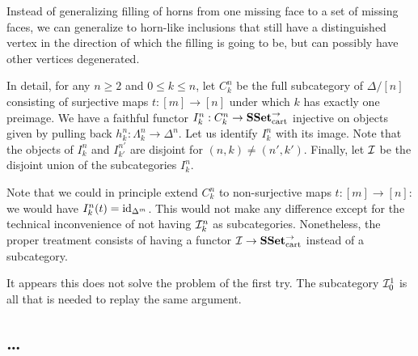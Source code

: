 \documentclass[reqno,10pt,a4paper,oneside]{amsart}
\begin{document}
Instead of generalizing filling of horns from one missing face to a set of missing faces, we can generalize to horn-like inclusions that still have a distinguished vertex in the direction of which the filling is going to be, but can possibly have other vertices degenerated.

In detail, for any $n \geq 2$ and $0 \leq k \leq n$, let $C_k^n$ be the full subcategory of $\Delta/[n]$ consisting of surjective maps $t : [m] \to [n]$ under which $k$ has exactly one preimage.
We have a faithful functor $I_k^n : C_k^n \to \SSet_{\text{cart}}^{\to}$ injective on objects given by pulling back $h_k^n : \Lambda_k^n \to \Delta^n$.
Let us identify $I_k^n$ with its image.
Note that the objects of $I_k^n$ and $I_{k'}^{n'}$ are disjoint for $(n, k) \neq (n', k')$.
Finally, let $\cal{I}$ be the disjoint union of the subcategories $I_k^n$.

Note that we could in principle extend $C_k^n$ to non-surjective maps $t : [m] \to [n]$: we would have $I_k^n(t) = \id_{\Delta^m}$.
This would not make any difference except for the technical inconvenience of not having $\cal{I}_k^n$ as subcategories.
Nonetheless, the proper treatment consists of having a functor $\cal{I} \to \SSet_{\text{cart}}^{\to}$ instead of a subcategory.

It appears this does not solve the problem of the first try.
The subcategory $\cal{I}_0^1$ is all that is needed to replay the same argument.

\subsection*{\ldots}
\end{document}
